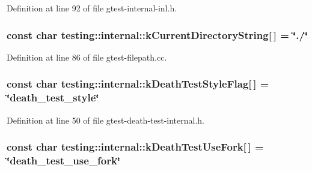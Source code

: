 Definition at line 92 of file gtest-\/internal-\/inl.\+h.

\subsubsection[{\texorpdfstring{k\+Current\+Directory\+String}{kCurrentDirectoryString}}]{\setlength{\rightskip}{0pt plus 5cm}const char testing\+::internal\+::k\+Current\+Directory\+String\mbox{[}$\,$\mbox{]} = \char`\"{}./\char`\"{}}\hypertarget{namespacetesting_1_1internal_a23a8e9527d0e544e7df2d64ad549ce3e}{}\label{namespacetesting_1_1internal_a23a8e9527d0e544e7df2d64ad549ce3e}


Definition at line 86 of file gtest-\/filepath.\+cc.

\subsubsection[{\texorpdfstring{k\+Death\+Test\+Style\+Flag}{kDeathTestStyleFlag}}]{\setlength{\rightskip}{0pt plus 5cm}const char testing\+::internal\+::k\+Death\+Test\+Style\+Flag\mbox{[}$\,$\mbox{]} = \char`\"{}death\+\_\+test\+\_\+style\char`\"{}}\hypertarget{namespacetesting_1_1internal_a008ebfe0c0347d65e5e06e4d310981b3}{}\label{namespacetesting_1_1internal_a008ebfe0c0347d65e5e06e4d310981b3}


Definition at line 50 of file gtest-\/death-\/test-\/internal.\+h.

\subsubsection[{\texorpdfstring{k\+Death\+Test\+Use\+Fork}{kDeathTestUseFork}}]{\setlength{\rightskip}{0pt plus 5cm}const char testing\+::internal\+::k\+Death\+Test\+Use\+Fork\mbox{[}$\,$\mbox{]} = \char`\"{}death\+\_\+test\+\_\+use\+\_\+fork\char`\"{}}\hypertarget{namespacetesting_1_1internal_a32051e2574562b548be3e26a52eaa553}{}\label{namespacetesting_1_1internal_a32051e2574562b548be3e26a52eaa553}


